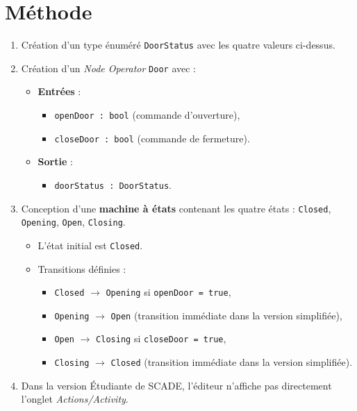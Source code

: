 \documentclass[11pt,a4paper]{report}
\begin{document}
\section*{Méthode}
\begin{enumerate}
  \item Création d’un type énuméré \texttt{DoorStatus} avec les quatre valeurs ci-dessus.
  \item Création d’un \textit{Node Operator} \texttt{Door} avec :
  \begin{itemize}
    \item \textbf{Entrées} :
      \begin{itemize}
        \item \texttt{openDoor : bool} (commande d’ouverture),
        \item \texttt{closeDoor : bool} (commande de fermeture).
      \end{itemize}
    \item \textbf{Sortie} :
      \begin{itemize}
        \item \texttt{doorStatus : DoorStatus}.
      \end{itemize}
  \end{itemize}
  \item Conception d’une \textbf{machine à états} contenant les quatre états :
  \texttt{Closed}, \texttt{Opening}, \texttt{Open}, \texttt{Closing}.
  \begin{itemize}
    \item L’état initial est \texttt{Closed}.
    \item Transitions définies :
      \begin{itemize}
        \item \texttt{Closed} $\rightarrow$ \texttt{Opening} si \texttt{openDoor = true},
        \item \texttt{Opening} $\rightarrow$ \texttt{Open} (transition immédiate dans la version simplifiée),
        \item \texttt{Open} $\rightarrow$ \texttt{Closing} si \texttt{closeDoor = true},
        \item \texttt{Closing} $\rightarrow$ \texttt{Closed} (transition immédiate dans la version simplifiée).
      \end{itemize}
  \end{itemize}
  \item Dans la version Étudiante de SCADE, l’éditeur n’affiche pas directement l’onglet \textit{Actions/Activity}.
  \begin{itemize}

\end{itemize}
\end{enumerate}
\end{document}
